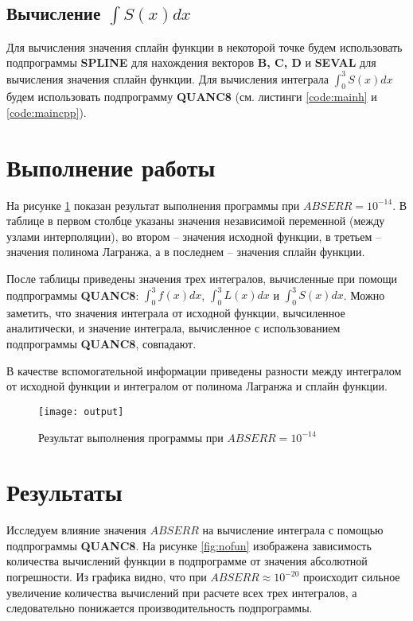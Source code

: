 \subsection{Вычисление $\int S(x)dx$}

Для вычисления значения сплайн функции в некоторой точке будем использовать подпрограммы \textbf{SPLINE} для нахождения векторов \textbf{B, C, D} и \textbf{SEVAL} для вычисления значения сплайн функции. Для вычисления интеграла $\int_0^3 S(x)dx$ будем использовать подпрограмму \textbf{QUANC8} (см. листинги \ref{code:mainh} и \ref{code:maincpp}).

\section{Выполнение работы}

На рисунке \ref{fig:res} показан результат выполнения программы при $ABSERR = 10^{-14}$. В таблице в первом столбце указаны значения независимой переменной (между узлами интерполяции), во втором -- значения исходной функции, в третьем -- значения полинома Лагранжа, а в последнем -- значения сплайн функции.

После таблицы приведены значения трех интегралов, вычисленные при помощи подпрограммы \textbf{QUANC8}: $\int_0^3 f(x)dx$, $\int_0^3 L(x)dx$ и $\int_0^3 S(x)dx$. Можно заметить, что значения интеграла от исходной функции, вычсиленное аналитически, и значение интеграла, вычисленное с использованием подпрограммы \textbf{QUANC8}, совпадают.

В качестве вспомогательной информации приведены разности между интегралом от исходной функции и интегралом от полинома Лагранжа и сплайн функции.

\begin{figure}[H]
\begin{center}
	\texttt{[image: output]}
	\caption{Результат выполнения программы при $ABSERR = 10^{-14}$}
	\label{fig:res}
\end{center}
\end{figure}

\vspace{-1cm}

\section{Результаты}

Исследуем влияние значения $ABSERR$ на вычисление интеграла с помощью подпрограммы \textbf{QUANC8}. На рисунке \ref{fig:nofun} изображена зависимость количества вычислений функции в подпрограмме от значения абсолютной погрешности. Из графика видно, что при $ABSERR \approx 10^{-20}$ происходит сильное увеличение количества вычислений при расчете всех трех интегралов, а следовательно понижается производительность подпрограммы.

